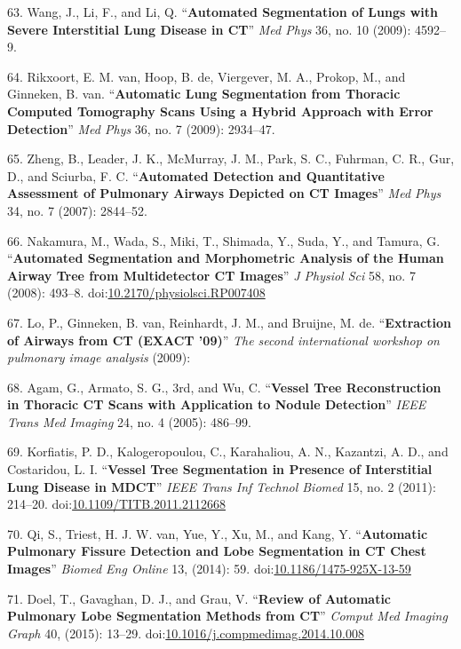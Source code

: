 \documentclass[11pt,]{article}
\begin{document}
63. Wang, J., Li, F., and Li, Q. ``\textbf{Automated Segmentation of
Lungs with Severe Interstitial Lung Disease in CT}'' \emph{Med Phys} 36,
no. 10 (2009): 4592--9.

64. Rikxoort, E. M. van, Hoop, B. de, Viergever, M. A., Prokop, M., and
Ginneken, B. van. ``\textbf{Automatic Lung Segmentation from Thoracic
Computed Tomography Scans Using a Hybrid Approach with Error
Detection}'' \emph{Med Phys} 36, no. 7 (2009): 2934--47.

65. Zheng, B., Leader, J. K., McMurray, J. M., Park, S. C., Fuhrman, C.
R., Gur, D., and Sciurba, F. C. ``\textbf{Automated Detection and
Quantitative Assessment of Pulmonary Airways Depicted on CT Images}''
\emph{Med Phys} 34, no. 7 (2007): 2844--52.

66. Nakamura, M., Wada, S., Miki, T., Shimada, Y., Suda, Y., and Tamura,
G. ``\textbf{Automated Segmentation and Morphometric Analysis of the
Human Airway Tree from Multidetector CT Images}'' \emph{J Physiol Sci}
58, no. 7 (2008): 493--8.
doi:\href{http://dx.doi.org/10.2170/physiolsci.RP007408}{10.2170/physiolsci.RP007408}

67. Lo, P., Ginneken, B. van, Reinhardt, J. M., and Bruijne, M. de.
``\textbf{Extraction of Airways from CT (EXACT '09)}'' \emph{The second
international workshop on pulmonary image analysis} (2009):

68. Agam, G., Armato, S. G., 3rd, and Wu, C. ``\textbf{Vessel Tree
Reconstruction in Thoracic CT Scans with Application to Nodule
Detection}'' \emph{IEEE Trans Med Imaging} 24, no. 4 (2005): 486--99.

69. Korfiatis, P. D., Kalogeropoulou, C., Karahaliou, A. N., Kazantzi,
A. D., and Costaridou, L. I. ``\textbf{Vessel Tree Segmentation in
Presence of Interstitial Lung Disease in MDCT}'' \emph{IEEE Trans Inf
Technol Biomed} 15, no. 2 (2011): 214--20.
doi:\href{http://dx.doi.org/10.1109/TITB.2011.2112668}{10.1109/TITB.2011.2112668}

70. Qi, S., Triest, H. J. W. van, Yue, Y., Xu, M., and Kang, Y.
``\textbf{Automatic Pulmonary Fissure Detection and Lobe Segmentation in
CT Chest Images}'' \emph{Biomed Eng Online} 13, (2014): 59.
doi:\href{http://dx.doi.org/10.1186/1475-925X-13-59}{10.1186/1475-925X-13-59}

71. Doel, T., Gavaghan, D. J., and Grau, V. ``\textbf{Review of
Automatic Pulmonary Lobe Segmentation Methods from CT}'' \emph{Comput
Med Imaging Graph} 40, (2015): 13--29.
doi:\href{http://dx.doi.org/10.1016/j.compmedimag.2014.10.008}{10.1016/j.compmedimag.2014.10.008}
\end{document}
